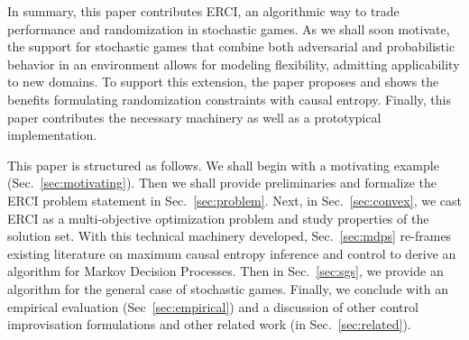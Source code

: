%
In summary, this paper contributes ERCI, an algorithmic way to trade
performance and randomization in stochastic games. As we shall soon
motivate, the support for stochastic games that combine both
adversarial and probabilistic behavior in an environment allows for
modeling flexibility, admitting applicability to new domains. To
support this extension, the paper proposes and shows the benefits
formulating randomization constraints with causal entropy.  Finally,
this paper contributes the necessary machinery as well as a
prototypical implementation.

 This paper is structured as follows. We shall begin
with a motivating example (Sec.~\ref{sec:motivating}). Then we shall
provide preliminaries and formalize the ERCI problem statement in
Sec.~\ref{sec:problem}. Next, in Sec.~\ref{sec:convex}, we cast ERCI
as a multi-objective optimization problem and study properties of the
solution set. With this technical machinery developed,
Sec.~\ref{sec:mdps} re-frames existing literature on maximum causal
entropy inference and control to derive an algorithm for Markov
Decision Processes.  Then in Sec.~\ref{sec:sgs}, we provide an
algorithm for the general case of stochastic games. Finally, we
conclude with an empirical evaluation (Sec~\ref{sec:empirical}) and a
discussion of other control improvisation formulations and other
related work (in Sec.~\ref{sec:related}).



